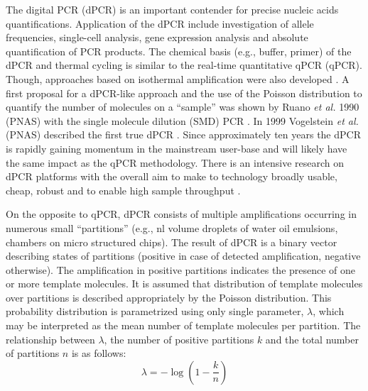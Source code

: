 \documentclass[a4,center,fleqn]{NAR}
\begin{document}
The digital PCR (dPCR) is an important contender for precise nucleic acids 
quantifications. Application of the dPCR include investigation of allele 
frequencies, single-cell analysis, gene expression analysis and absolute 
quantification of PCR products. The chemical basis (e.g., buffer, primer) of the 
dPCR and thermal cycling is similar to the real-time quantitative qPCR (qPCR). 
Though, approaches based on isothermal amplification were also developed 
\cite{pabinger_survey_2014, ludlow_2014, rodiger_r_2015}. A first proposal for a 
dPCR-like approach and the use of the Poisson distribution to quantify the 
number of molecules on a ``sample'' was shown by Ruano \textit{et al.} 1990 
(PNAS) with the single molecule dilution (SMD) PCR \cite{ruano_haplotype_1990}. 
In 1999 Vogelstein \textit{et al.} (PNAS) described the first true dPCR 
\cite{vogelstein_digital_1999}. Since approximately ten years the dPCR is 
rapidly gaining momentum in the mainstream user-base and will likely have the 
same impact as the qPCR methodology. There is an intensive research on dPCR 
platforms with the overall aim to make to technology broadly usable, cheap, 
robust and to enable high sample throughput \cite{selck_increased_2013, 
huggett_qpcr_2015, morley_digital_2014}. 

\enlargethispage{-65.1pt}

On the opposite to qPCR, dPCR consists of multiple amplifications occurring in 
numerous small ``partitions'' (e.g., nl volume droplets of water oil 
emulsions, chambers on micro structured chips). The result of dPCR is a binary 
vector describing states of partitions (positive in case of detected 
amplification, negative otherwise). The amplification in positive partitions 
indicates the presence of one or more template molecules. It is assumed that 
distribution of template molecules over partitions is described appropriately 
by the Poisson distribution. This probability distribution is parametrized 
using only single parameter, $\lambda$, which may be interpreted as the mean 
number of template molecules per partition. The relationship between 
$\lambda$, the number of positive partitions $k$ and the total number of 
partitions $n$ is as follows:
\begin{equation}
 \lambda = -\log{\left( 1 - \frac{k}{n} \right)}
\end{equation}
\end{document}
